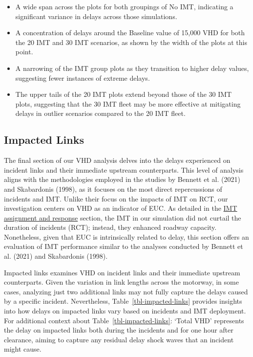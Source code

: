 \documentclass[fancy, oneside, mastersfancy, ms]{byuthesis}
\providecommand{\tightlist}{%
  \setlength{\itemsep}{0pt}\setlength{\parskip}{0pt}}\usepackage{longtable,booktabs,array}
\begin{document}
\begin{itemize}
\tightlist
\item
  A wide span across the plots for both groupings of No IMT, indicating
  a significant variance in delays across those simulations.
\item
  A concentration of delays around the Baseline value of 15,000 VHD for
  both the 20 IMT and 30 IMT scenarios, as shown by the width of the
  plots at this point.
\item
  A narrowing of the IMT group plots as they transition to higher delay
  values, suggesting fewer instances of extreme delays.
\item
  The upper tails of the 20 IMT plots extend beyond those of the 30 IMT
  plots, suggesting that the 30 IMT fleet may be more effective at
  mitigating delays in outlier scenarios compared to the 20 IMT fleet.
\end{itemize}

\hypertarget{sec-impacted}{%
\subsection{Impacted Links}\label{sec-impacted}}

The final section of our VHD analysis delves into the delays experienced
on incident links and their immediate upstream counterparts. This level
of analysis aligns with the methodologies employed in the studies by
Bennett et al. (2021) and Skabardonis (1998), as it focuses on the most
direct repercussions of incidents and IMT. Unlike their focus on the
impacts of IMT on RCT, our investigation centers on VHD as an indicator
of EUC. As detailed in the \protect\hyperlink{sec-imt_response}{IMT
assignment and response} section, the IMT in our simulation did not
curtail the duration of incidents (RCT); instead, they enhanced roadway
capacity. Nonetheless, given that EUC is intrinsically related to delay,
this section offers an evaluation of IMT performance similar to the
analyses conducted by Bennett et al. (2021) and Skabardonis (1998).

Impacted links examines VHD on incident links and their immediate
upstream counterparts. Given the variation in link lengths across the
motorway, in some cases, analyzing just two additional links may not
fully capture the delays caused by a specific incident. Nevertheless,
Table~\ref{tbl-impacted-links} provides insights into how delays on
impacted links vary based on incidents and IMT deployment. For
additional context about Table~\ref{tbl-impacted-links}: `Total VHD'
represents the delay on impacted links both during the incidents and for
one hour after clearance, aiming to capture any residual delay shock
waves that an incident might cause.
\end{document}
